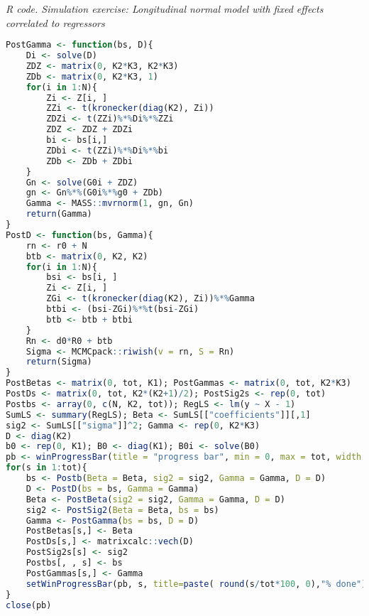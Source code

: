 \begin{enumerate}[leftmargin=*]
\begin{tcolorbox}[enhanced,width=4.67in,center upper,
	fontupper=\large\bfseries,drop shadow southwest,sharp corners]
	\textit{R code. Simulation exercise: Longitudinal normal model with fixed effects correlated to regressors}
	\begin{VF}
		\begin{lstlisting}[language=R]
PostGamma <- function(bs, D){
	Di <- solve(D)
	ZDZ <- matrix(0, K2*K3, K2*K3)
	ZDb <- matrix(0, K2*K3, 1)
	for(i in 1:N){
		Zi <- Z[i, ]
		ZZi <- t(kronecker(diag(K2), Zi))
		ZDZi <- t(ZZi)%*%Di%*%ZZi
		ZDZ <- ZDZ + ZDZi
		bi <- bs[i,]
		ZDbi <- t(ZZi)%*%Di%*%bi
		ZDb <- ZDb + ZDbi
	}
	Gn <- solve(G0i + ZDZ)
	gn <- Gn%*%(G0i%*%g0 + ZDb)
	Gamma <- MASS::mvrnorm(1, gn, Gn)
	return(Gamma)
}
PostD <- function(bs, Gamma){
	rn <- r0 + N
	btb <- matrix(0, K2, K2)
	for(i in 1:N){
		bsi <- bs[i, ]
		Zi <- Z[i, ]
		ZGi <- t(kronecker(diag(K2), Zi))%*%Gamma
		btbi <- (bsi-ZGi)%*%t(bsi-ZGi)
		btb <- btb + btbi
	}
	Rn <- d0*R0 + btb
	Sigma <- MCMCpack::riwish(v = rn, S = Rn)
	return(Sigma)
}
PostBetas <- matrix(0, tot, K1); PostGammas <- matrix(0, tot, K2*K3)
PostDs <- matrix(0, tot, K2*(K2+1)/2); PostSig2s <- rep(0, tot)
Postbs <- array(0, c(N, K2, tot)); RegLS <- lm(y ~ X - 1)
SumLS <- summary(RegLS); Beta <- SumLS[["coefficients"]][,1]
sig2 <- SumLS[["sigma"]]^2; Gamma <- rep(0, K2*K3)
D <- diag(K2)
b0 <- rep(0, K1); B0 <- diag(K1); B0i <- solve(B0) 
pb <- winProgressBar(title = "progress bar", min = 0, max = tot, width = 300)
for(s in 1:tot){
	bs <- Postb(Beta = Beta, sig2 = sig2, Gamma = Gamma, D = D)
	D <- PostD(bs = bs, Gamma = Gamma)
	Beta <- PostBeta(sig2 = sig2, Gamma = Gamma, D = D)
	sig2 <- PostSig2(Beta = Beta, bs = bs)
	Gamma <- PostGamma(bs = bs, D = D) 
	PostBetas[s,] <- Beta
	PostDs[s,] <- matrixcalc::vech(D)
	PostSig2s[s] <- sig2
	Postbs[, , s] <- bs
	PostGammas[s,] <- Gamma
	setWinProgressBar(pb, s, title=paste( round(s/tot*100, 0),"% done"))
}
close(pb)
\end{lstlisting}
	\end{VF}
\end{tcolorbox}


\end{enumerate}
